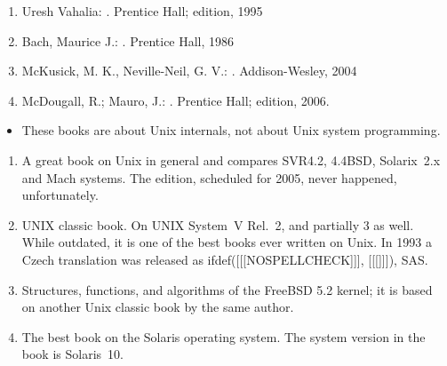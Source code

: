 

\begin{slide}

\begin{enumerate}
\item Uresh Vahalia: .
 Prentice Hall;  edition, 1995
\item Bach, Maurice J.: .
Prentice Hall, 1986
\item McKusick, M. K., Neville-Neil, G. V.: . Addison-Wesley, 2004
\item McDougall, R.; Mauro, J.: . Prentice Hall; 
edition, 2006.
\end{enumerate}
\end{slide}

\begin{itemize}
\item These books are about Unix internals, not about Unix system programming.
\end{itemize}

\begin{enumerate}
\item A great book on Unix in general and compares SVR4.2, 4.4BSD, Solarix~2.x
and Mach systems.  The  edition, scheduled for 2005, never happened,
unfortunately.
\item UNIX classic book. On UNIX System~V Rel.~2, and partially 3 as well.
While outdated, it is one of the best books ever written on Unix.  In 1993 a
Czech translation was released as
ifdef([[[NOSPELLCHECK]]],
[[[]]]), SAS.
\item Structures, functions, and algorithms of the FreeBSD 5.2 kernel; it is
based on another Unix classic book  by the same author.
\item The best book on the Solaris operating system.  The system version in the
book is Solaris~10.
\end{enumerate}


